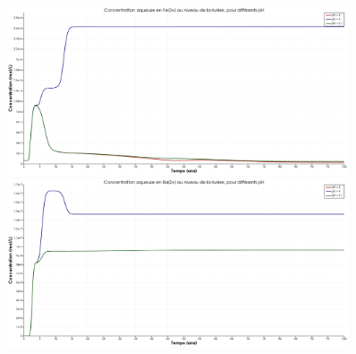 \documentclass{article}
\begin{document}
\begin{figure}[H]
    \centering
    \begin{minipage}{0.5\textwidth}
        \centering
        \includegraphics[width=0.9\textwidth]{III_B_2_13.png} 
        \caption{}
        \label{fig:Fe_riviere_comparaison}
    \end{minipage}\hfill
    \begin{minipage}{0.5\textwidth}
        \centering
        \includegraphics[width=0.9\textwidth]{III_B_2_14.png} 
        \caption{}
        \label{fig:Ba_rivier_comparaison}
    \end{minipage}
\end{figure}
\end{document}
